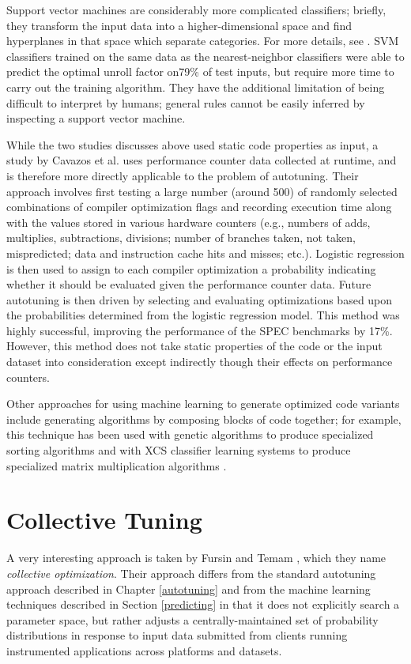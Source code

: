 \documentclass[msthesis,justified,copyright,final,numbers,sort&compress,
gsmodern,amstex,natbib]{uothesis}
\begin{document}
Support vector machines are considerably more complicated classifiers; briefly, they transform the input data into a higher-dimensional space and find hyperplanes in that space which separate categories. For more details, see \cite{svm}. SVM classifiers trained on the same data as the nearest-neighbor classifiers were able to predict the optimal unroll factor on79\% of test inputs, but require more time to carry out the training algorithm. They have the additional limitation of being difficult to interpret by humans; general rules cannot be easily inferred by inspecting a support vector machine.

While the two studies discusses above used static code properties as input, a study by Cavazos et al. \cite{counters} uses performance counter data collected at runtime, and is therefore more directly applicable to the problem of autotuning. Their approach involves first testing a large number (around 500) of randomly selected combinations of compiler optimization flags and recording execution time along with the values stored in various hardware counters (e.g., numbers of adds, multiplies, subtractions, divisions; number of branches taken, not taken, mispredicted; data and instruction cache hits and misses; etc.). Logistic regression is then used to assign to each compiler optimization a probability indicating whether it should be evaluated given the performance counter data. Future autotuning is then driven by selecting and evaluating optimizations based upon the probabilities determined from the logistic regression model. This method was highly successful, improving the performance of the SPEC benchmarks by 17\%. However, this method does not take static properties of the code or the input dataset into consideration except indirectly though their effects on performance counters.

Other approaches for using machine learning to generate optimized code variants include generating algorithms by composing blocks of code together; for example, this technique has been used with genetic algorithms to produce specialized sorting algorithms \cite{sorting} and with XCS classifier learning systems to produce specialized matrix multiplication algorithms \cite{classifier}.

\section{Collective Tuning}

A very interesting approach is taken by Fursin and Temam \cite{collective}, which they name \emph{collective optimization}. Their approach differs from the standard autotuning approach described in Chapter \ref{autotuning} and from the machine learning techniques described in Section \ref{predicting} in that it does not explicitly search a parameter space, but rather adjusts a centrally-maintained set of probability distributions in response to input data submitted from clients running instrumented applications across platforms and datasets. 
\end{document}
